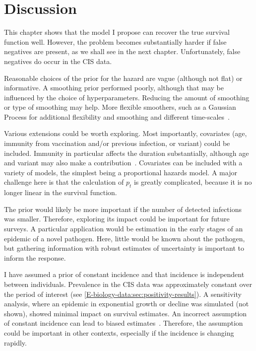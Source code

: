 \documentclass[thesis.tex]{subfiles}
\begin{document}
\section{Discussion} \label{perf-test:sec:discussion}

This chapter shows that the model I propose can recover the true survival function well.
However, the problem becomes substantially harder if false negatives are present, as we shall see in the next chapter.
Unfortunately, false negatives do occur in the CIS data.

Reasonable choices of the prior for the hazard are vague (although not flat) or informative.
A smoothing prior performed poorly, although that may be influenced by the choice of hyperparameters.
Reducing the amount of smoothing or type of smoothing may help.
More flexible smoothers, such as a Gaussian Process for additional flexibility and smoothing and different time-scales~\autocite{saulGaussian}.

Various extensions could be worth exploring.
Most importantly, covariates (\eg age, immunity from vaccination and/or previous infection, or variant) could be included.
Immunity in particular affects the duration substantially, although age and variant may also make a contribution~\autocite{hakkiOnset,russellWithinhost}.
Covariates can be included with a variety of models, the simplest being a proportional hazards model.
A major challenge here is that the calculation of $p_t$ is greatly complicated, because it is no longer linear in the survival function.

The prior would likely be more important if the number of detected infections was smaller.
Therefore, exploring its impact could be important for future surveys.
A particular application would be estimation in the early stages of an epidemic of a novel pathogen.
Here, little would be known about the pathogen, but gathering information with robust estimates of uncertainty is important to inform the response.

I have assumed a prior of constant incidence and that incidence is independent between individuals.
Prevalence in the CIS data was approximately constant over the period of interest (see \cref{E-biology-data:sec:positivity-results}).
A sensitivity analysis, where an epidemic in exponential growth or decline was simulated (not shown), showed minimal impact on survival estimates.
An incorrect assumption of constant incidence can lead to biased estimates~\autocite{degruttolaAnalysis}.
Therefore, the assumption could be important in other contexts, especially if the incidence is changing rapidly.
\end{document}
